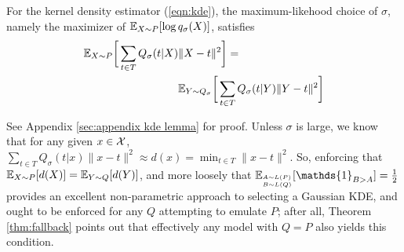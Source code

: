 \begin{lemma}
For the kernel density estimator (\ref{eqn:kde}), the maximum-likehood choice of $\sigma$, namely the maximizer of ${\mathbb E}_{X \sim P}[\log q_\sigma(X)]$, satisfies
\begin{align*}
	{\mathbb E}_{X \sim P} \bigg[ \sum_{t \in T} Q_\sigma(t|X) &\|X - t\|^2 \bigg] = \\
	&{\mathbb E}_{Y \sim Q_\sigma} \bigg[ \sum_{t \in T} Q_\sigma(t|Y) \|Y - t\|^2 \bigg]
\end{align*}
\label{lemma:kde}
\end{lemma}
See Appendix \ref{sec:appendix kde lemma} for proof.
Unless $\sigma$ is large, we know that for any given $x \in \mathcal{X}$, $\sum_{t \in T} Q_\sigma(t|x) \|x - t\|^2 \approx d(x) = \min_{t \in T} \|x - t\|^2 $. So, enforcing that ${\mathbb E}_{X \sim P}[d(X)] = {\mathbb E}_{Y \sim Q}[d(Y)]$, and more loosely that $\E_{^{A \sim L(P)}_{B \sim L(Q)}}[\mathds{1}_{B > A}] = \frac{1}{2}$ provides an excellent non-parametric approach to selecting a Gaussian KDE, and ought to be enforced for any $Q$ attempting to emulate $P$; after all, Theorem \ref{thm:fallback} points out that effectively any model with $Q = P$ also yields this condition. 
